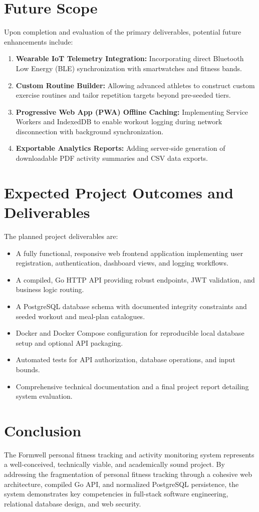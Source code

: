 \documentclass[11pt,a4paper]{report}
\begin{document}
\section{Future Scope }
Upon completion and evaluation of the primary deliverables, potential future enhancements include:
\begin{enumerate}
  \item \textbf{Wearable IoT Telemetry Integration:} Incorporating direct Bluetooth Low Energy (BLE) synchronization with smartwatches and fitness bands.
  \item \textbf{Custom Routine Builder:} Allowing advanced athletes to construct custom exercise routines and tailor repetition targets beyond pre-seeded tiers.
  \item \textbf{Progressive Web App (PWA) Offline Caching:} Implementing Service Workers and IndexedDB to enable workout logging during network disconnection with background synchronization.
  \item \textbf{Exportable Analytics Reports:} Adding server-side generation of downloadable PDF activity summaries and CSV data exports.
\end{enumerate}

\section{Expected Project Outcomes and Deliverables}
The planned project deliverables are:
\begin{itemize}
  \item A fully functional, responsive web frontend application implementing user registration, authentication, dashboard views, and logging workflows.
  \item A compiled, Go HTTP API providing robust endpoints, JWT validation, and business logic routing.
  \item A PostgreSQL database schema with documented integrity constraints and seeded workout and meal-plan catalogues.
  \item Docker and Docker Compose configuration for reproducible local database setup and optional API packaging.
  \item Automated tests for API authorization, database operations, and input bounds.
  \item Comprehensive technical documentation and a final project report detailing system evaluation.
\end{itemize}	

\section{Conclusion}
The Formwell personal fitness tracking and activity monitoring system represents a well-conceived, technically viable, and academically sound project. By addressing the fragmentation of personal fitness tracking through a cohesive web architecture, compiled Go API, and normalized PostgreSQL persistence, the system demonstrates key competencies in full-stack software engineering, relational database design, and web security.
\end{document}
